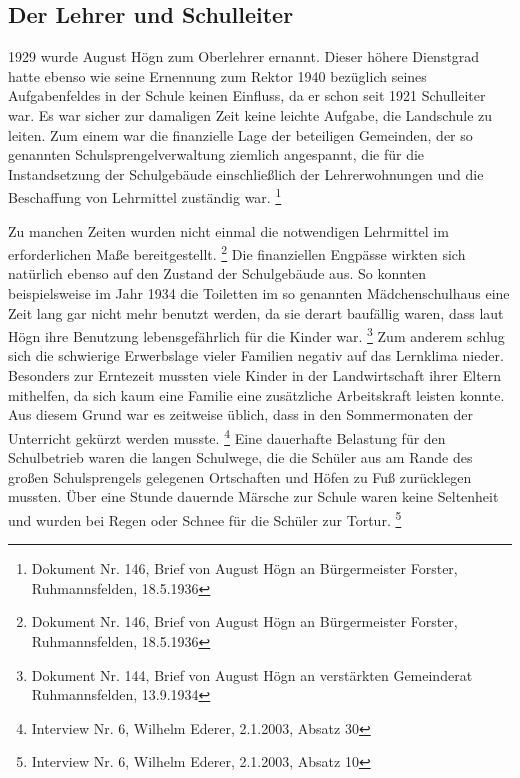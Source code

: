 \subsection{Der Lehrer und Schulleiter}

\hypertarget{RefHeadingToc100333733}{}1929 wurde August Högn zum
Oberlehrer ernannt. Dieser höhere Dienstgrad hatte ebenso wie seine
Ernennung zum Rektor 1940 bezüglich seines Aufgabenfeldes in der Schule
keinen Einfluss, da er schon seit 1921 Schulleiter war. Es war sicher
zur damaligen Zeit keine leichte Aufgabe, die Landschule zu leiten. Zum
einem war die finanzielle Lage der beteiligen Gemeinden, der so
genannten Schulsprengelverwaltung ziemlich angespannt, die für die
Instandsetzung der Schulgebäude einschließlich der Lehrerwohnungen und
die Beschaffung von Lehrmittel zuständig war. \footnote{Dokument Nr.
146, Brief von August Högn an Bürgermeister Forster, Ruhmannsfelden,
18.5.1936}

Zu manchen Zeiten wurden nicht einmal die notwendigen Lehrmittel im
erforderlichen Maße bereitgestellt. \footnote{Dokument Nr. 146, Brief
von August Högn an Bürgermeister Forster, Ruhmannsfelden, 18.5.1936}
Die finanziellen Engpässe wirkten sich natürlich ebenso auf den Zustand
der Schulgebäude aus. So konnten beispielsweise im Jahr 1934 die
Toiletten im so genannten Mädchenschulhaus eine Zeit lang gar nicht
mehr benutzt werden, da sie derart baufällig waren, dass laut Högn ihre
Benutzung lebensgefährlich für die Kinder war. \footnote{Dokument Nr.
144, Brief von August Högn an verstärkten Gemeinderat Ruhmannsfelden,
13.9.1934} Zum anderem schlug sich die schwierige Erwerbslage vieler
Familien negativ auf das Lernklima nieder. Besonders zur Erntezeit
mussten viele Kinder in der Landwirtschaft ihrer Eltern mithelfen, da
sich kaum eine Familie eine zusätzliche Arbeitskraft leisten konnte.
Aus diesem Grund war es zeitweise üblich, dass in den Sommermonaten der
Unterricht gekürzt werden musste. \footnote{Interview Nr. 6, Wilhelm
Ederer, 2.1.2003, Absatz 30} Eine dauerhafte Belastung für den
Schulbetrieb waren die langen Schulwege, die die Schüler aus am Rande
des großen Schulsprengels gelegenen Ortschaften und Höfen zu Fuß
zurücklegen mussten. Über eine Stunde dauernde Märsche zur Schule waren
keine Seltenheit und wurden bei Regen oder Schnee für die Schüler zur
Tortur. \footnote{Interview Nr. 6, Wilhelm Ederer, 2.1.2003, Absatz 10}

